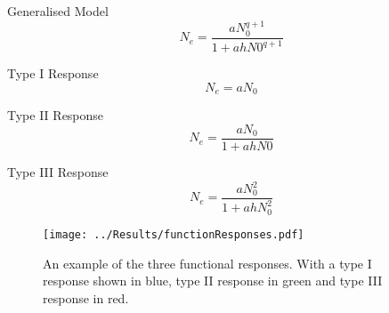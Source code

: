 \documentclass[a4paper]{article}
\numberwithin{equation}{section}
\begin{document}
Generalised Model
\begin{equation} 
	N_e = \frac{aN_0^{q+1}}{1+ahN0^{q+1}}
	\label{general}
\end{equation}

Type I Response
\begin{equation}
	N_e = aN_0 
	\label{typeI}
\end{equation}

Type II Response
\begin{equation}
	N_e = \frac{aN_0}{1+ahN0}
	\label{typeII}
\end{equation}

Type III Response
\begin{equation} 
	N_e = \frac{aN_0^2}{1+ahN_0^2}
	\label{typeIII}
\end{equation}
\begin{figure}[H]
	\label{functionalResp}
	\begin{center}
		\texttt{[image: ../Results/functionResponses.pdf]}
	\end{center}
	\caption{An example of the three functional responses. With a type I response shown in blue, type II response in green and type III response in red.}
	\label{func_resp}	
\end{figure}
\end{document}
